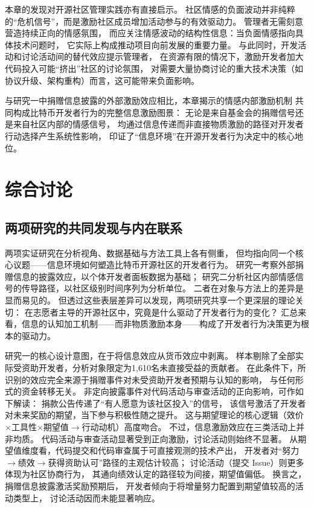 \documentclass[
    type = master, %
    degree = professional,        %
    decl-page,  %
    twoside,                %
    fontset = fandol %
  ]{njuthesis}
\begin{document}
本章的发现对开源社区管理实践亦有直接启示。
社区情感的负面波动并非纯粹的“危机信号”，而是激励社区成员增加活动参与的有效驱动力。
管理者无需刻意营造持续正向的情感氛围，
而应关注情感波动的结构性信息：当负面情感指向具体技术问题时，
它实际上构成推动项目向前发展的重要力量。
与此同时，开发活动和讨论活动间的替代效应提示管理者，
在资源有限的情况下，激励开发者加大代码投入可能“挤出”社区的讨论氛围，
对需要大量协商讨论的重大技术决策（如协议升级、架构重构）而言，这可能带来负面影响。

与研究一中捐赠信息披露的外部激励效应相比，本章揭示的情感内部激励机制
共同构成比特币开发者行为的完整信息激励图景：
无论是来自基金会的捐赠信号还是来自社区内部的情感信号，
均通过信息传递而非直接物质激励的路径对开发者行动选择产生系统性影响，
印证了“信息环境”在开源开发者行为决定中的核心地位。



\chapter{综合讨论}

\section{两项研究的共同发现与内在联系}

两项实证研究在分析视角、数据基础与方法工具上各有侧重，
但均指向同一个核心议题——信息环境如何塑造比特币开源社区的开发者行为。
研究一考察外部捐赠信息的披露效应，以个体开发者面板数据为基础；
研究二分析社区内部情感信号的传导路径，以社区级别时间序列为分析单位。
二者在对象与方法上的差异是显而易见的。
但透过这些表层差异可以发现，两项研究共享一个更深层的理论关切：
在志愿者主导的开源社区中，究竟是什么驱动了开发者行为的变化？
汇总来看，信息的认知加工机制——而非物质激励本身——构成了开发者行为决策更为根本的驱动力。

研究一的核心设计意图，在于将信息效应从货币效应中剥离。
样本剔除了全部实际受资助开发者，分析对象限定为1,610名未直接受益的贡献者。
在此条件下，所识别的效应完全来源于捐赠事件对未受资助开发者预期与认知的影响，
与任何形式的资金转移无关。
非定向披露事件对代码活动与审查活动的正向影响，可作如下解读：
捐款公告传递了“有人愿意为该社区投入”的信号，
该信号激活了开发者对未来奖励的期望，当下参与积极性随之提升。
这与期望理论\cite{vroom1964work}的核心逻辑（效价$\times$工具性$\times$期望值$\to$行动动机）高度吻合。
不过，信息激励效应在三类活动上并非均质。
代码活动与审查活动显著受到正向激励，讨论活动则始终不显著。
从期望值维度看，代码提交和代码审查属于可直接观测的技术产出，
开发者对“努力$\to$绩效$\to$获得资助认可”路径的主观估计较高；
讨论活动（提交 Issue）则更多体现为社区协商行为，
其通向绩效认定的路径较为间接，期望值偏低。
换言之，捐赠信息披露激活奖励预期后，
开发者倾向于将增量努力配置到期望值较高的活动类型上，
讨论活动因而未能显著响应。
\end{document}
